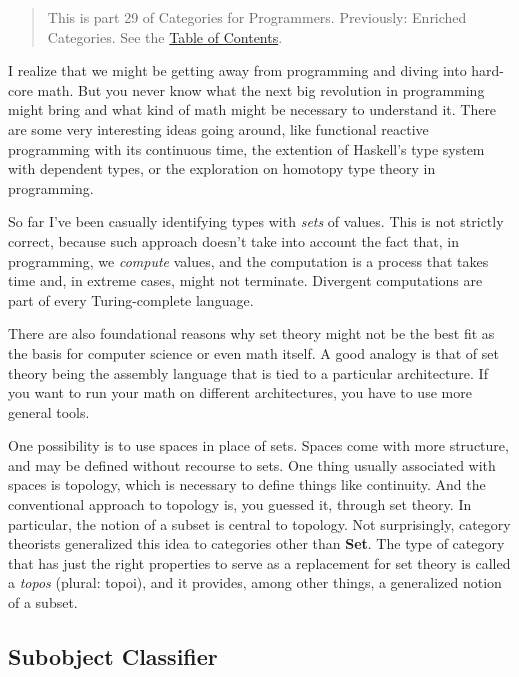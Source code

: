 \begin{quote}
This is part 29 of Categories for Programmers. Previously: {Enriched
Categories}. See the
\href{https://bartoszmilewski.com/2014/10/28/category-theory-for-programmers-the-preface/}{Table
of Contents}.
\end{quote}

I realize that we might be getting away from programming and diving into
hard-core math. But you never know what the next big revolution in
programming might bring and what kind of math might be necessary to
understand it. There are some very interesting ideas going around, like
functional reactive programming with its continuous time, the extention
of Haskell's type system with dependent types, or the exploration on
homotopy type theory in programming.

So far I've been casually identifying types with \emph{sets} of values.
This is not strictly correct, because such approach doesn't take into
account the fact that, in programming, we \emph{compute} values, and the
computation is a process that takes time and, in extreme cases, might
not terminate. Divergent computations are part of every Turing-complete
language.

There are also foundational reasons why set theory might not be the best
fit as the basis for computer science or even math itself. A good
analogy is that of set theory being the assembly language that is tied
to a particular architecture. If you want to run your math on different
architectures, you have to use more general tools.

One possibility is to use spaces in place of sets. Spaces come with more
structure, and may be defined without recourse to sets. One thing
usually associated with spaces is topology, which is necessary to define
things like continuity. And the conventional approach to topology is,
you guessed it, through set theory. In particular, the notion of a
subset is central to topology. Not surprisingly, category theorists
generalized this idea to categories other than \textbf{Set}. The type of
category that has just the right properties to serve as a replacement
for set theory is called a \emph{topos} (plural: topoi), and it
provides, among other things, a generalized notion of a subset.

\subsection{Subobject Classifier}\label{subobject-classifier}

